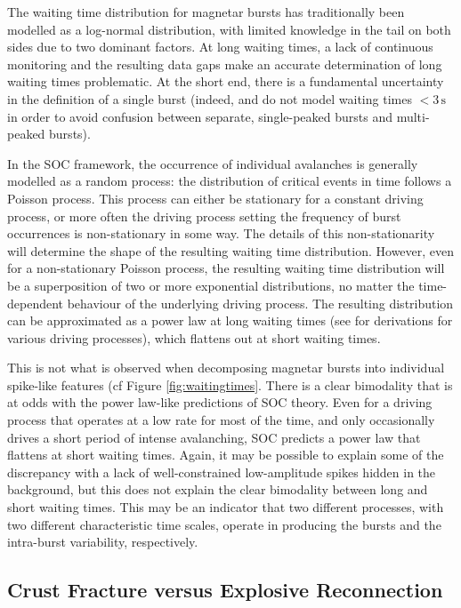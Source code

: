 \documentclass[12pt]{emulateapj}
\begin{document}
The waiting time distribution for magnetar bursts has traditionally been modelled as a log-normal distribution, with limited knowledge 
in the tail on both sides due to two dominant factors. At long waiting times, a lack of continuous monitoring and the resulting data gaps
make an accurate determination of long waiting times problematic. At the short end, there is a fundamental uncertainty in the definition of 
a single burst (indeed, \citealp{gogus1999} and \citealp{gogus2000} do not model waiting times $<3\,\mathrm{s}$ in order to avoid confusion between 
separate, single-peaked bursts and multi-peaked bursts). 

In the SOC framework, the occurrence of individual avalanches is generally modelled as a random process: the distribution of critical events in time
follows a Poisson process. This process can either be stationary for a constant driving process, or more often the driving process setting the frequency
of burst occurrences is non-stationary in some way. The details of this non-stationarity will determine the shape of the resulting waiting time distribution.
However, even for a non-stationary Poisson process, the resulting waiting time distribution will be a superposition of two or more exponential distributions,
no matter the time-dependent behaviour of the underlying driving process. The resulting distribution 
can be approximated as a power law at long waiting times (see \citealp{aschwanden2011} for derivations for various driving processes), which flattens out at 
short waiting times. 

This is not what is observed when decomposing magnetar bursts into individual spike-like features (cf Figure \ref{fig:waitingtimes}. There is a
clear bimodality that is at odds with the power law-like predictions of SOC theory. Even for a driving process that operates at a low
rate for most of the time, and only occasionally drives a short period of intense avalanching, SOC predicts a power law that flattens at short
waiting times. Again, it may be possible to explain some of the discrepancy with a lack of well-constrained low-amplitude spikes hidden in 
the background, but this does not explain the clear bimodality between long and short waiting times. This may be an indicator that two different
processes, with two different characteristic time scales, operate in producing the bursts and the intra-burst variability, respectively. 


\subsection{Crust Fracture versus Explosive Reconnection}
\end{document}
